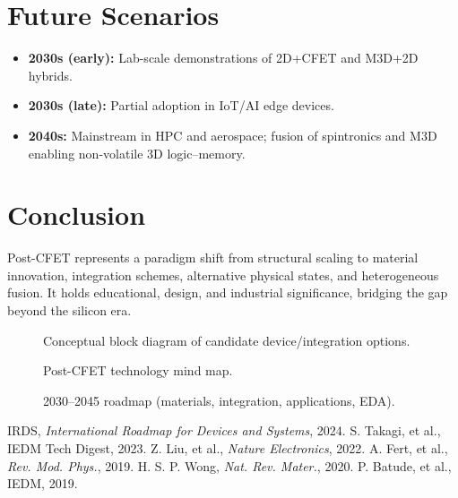 \documentclass[conference]{IEEEtran}
\newcommand{\figpath}{figures}     %
\newcommand{\tikzcol}[2][\linewidth]{%
  \resizebox{#1}{!}{}}
\begin{document}
\section{Future Scenarios}
\begin{itemize}
  \item \textbf{2030s (early):} Lab-scale demonstrations of 2D+CFET and M3D+2D hybrids.
  \item \textbf{2030s (late):} Partial adoption in IoT/AI edge devices.
  \item \textbf{2040s:} Mainstream in HPC and aerospace; fusion of spintronics and M3D enabling non-volatile 3D logic–memory.
\end{itemize}

\section{Conclusion}
Post-CFET represents a paradigm shift from structural scaling to material innovation, integration schemes, alternative physical states, and heterogeneous fusion. 
It holds educational, design, and industrial significance, bridging the gap beyond the silicon era.

\FloatBarrier

\begin{figure*}[!t]
  \centering
  \tikzcol[0.95\textwidth]{\figpath/block_diagram.tex}
  \caption{Conceptual block diagram of candidate device/integration options.}
  \label{fig:block}
\end{figure*}

\begin{figure*}[!t]
  \centering
  \tikzcol[0.95\textwidth]{\figpath/mindmap.tex}
  \caption{Post-CFET technology mind map.}
  \label{fig:mindmap}
\end{figure*}

\begin{figure*}[!t]
  \centering
  \tikzcol[0.95\textwidth]{\figpath/roadmap.tex}
  \caption{2030–2045 roadmap (materials, integration, applications, EDA).}
  \label{fig:roadmap}
\end{figure*}

\begin{thebibliography}{1}
 IRDS, \emph{International Roadmap for Devices and Systems}, 2024.
 S. Takagi, et al., IEDM Tech Digest, 2023.
 Z. Liu, et al., \emph{Nature Electronics}, 2022.
 A. Fert, et al., \emph{Rev. Mod. Phys.}, 2019.
 H. S. P. Wong, \emph{Nat. Rev. Mater.}, 2020.
 P. Batude, et al., IEDM, 2019.
\end{thebibliography}
\end{document}
